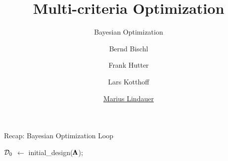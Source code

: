 


\newcommand{\a}[0]{\mathbf{a}}
\newcommand{\y}[0]{\mathbf{y}}
\newcommand{\q}[0]{\mathbf{q}}
\newcommand{\Xspace}[0]{\mathcal{X}}

\title[AutoML: Overview]{Multi-criteria Optimization}
\subtitle{Bayesian Optimization}
\author[Bernd Bischl]{Bernd Bischl \and Frank Hutter \and Lars Kotthoff \and \underline{Marius Lindauer}}
\institute{}
\date{}






	\maketitle



\begin{frame}{Recap: Bayesian Optimization Loop}

\begin{algorithm}[H]
	\BlankLine
	$\mathcal{D}_0$ $\leftarrow$ initial\_design($\pmb{\Lambda}$);

	\For{\bocount = $1, 2, \ldots \bobudget - |\dataset_0|$}{
		$\surro$ $\leftarrow$ fit predictive model on $\dataset_{\bocount-1}$;

		select $\bonextsample$ by optimizing $\bonextsample \in \argmax_{\conf \in \pcs} \acq(\conf; \dataset_{\bocount-1}, \surro)$;

		Query $\bonextobs := \func(\bonextsample)$;

		Add observation to data $\dataset_{\bocount} := \dataset_{\bocount-1} \cup \{\langle \bonextsample, \bonextobs \rangle \}$;\\
	}
	\caption{BO loop}
\end{algorithm}

\end{frame}

